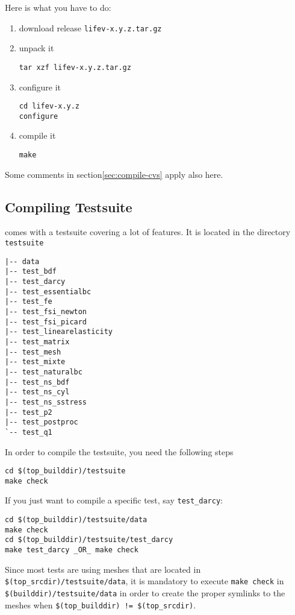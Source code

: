 Here is what you have to do:

\begin{enumerate}
\item download \lifev release \verb!lifev-x.y.z.tar.gz!
\item unpack it
\begin{verbatim}
tar xzf lifev-x.y.z.tar.gz
\end{verbatim}
\item configure it
\begin{verbatim}
cd lifev-x.y.z
configure
\end{verbatim}
\item compile it
\begin{verbatim}
make
\end{verbatim}
\end{enumerate}

Some comments in section\ref{sec:compile-cvs} apply also here.

\subsection{Compiling Testsuite}

\noindent \lifev comes with a testsuite covering a lot of features. It is located in the directory \verb+testsuite+
\begin{verbatim}
|-- data
|-- test_bdf
|-- test_darcy
|-- test_essentialbc
|-- test_fe
|-- test_fsi_newton
|-- test_fsi_picard
|-- test_linearelasticity
|-- test_matrix
|-- test_mesh
|-- test_mixte
|-- test_naturalbc
|-- test_ns_bdf
|-- test_ns_cyl
|-- test_ns_sstress
|-- test_p2
|-- test_postproc
`-- test_q1
\end{verbatim}

\noindent In order to compile the testsuite, you need the following steps
\begin{verbatim}
cd $(top_builddir)/testsuite
make check
\end{verbatim}

\noindent If you just want to compile a specific test, say \verb+test_darcy+:
\begin{verbatim}
cd $(top_builddir)/testsuite/data 
make check
cd $(top_builddir)/testsuite/test_darcy
make test_darcy _OR_ make check
\end{verbatim}

\noindent Since most tests are using meshes that are located in
\verb+$(top_srcdir)/testsuite/data+, it is mandatory to execute \verb+make check+ in
\verb+$(builddir)/testsuite/data+ in order to create the proper
symlinks to the meshes when \verb+$(top_builddir) != $(top_srcdir)+.

%
%
